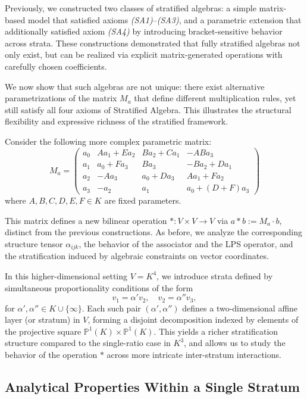 \documentclass[12pt]{article}
\theoremstyle{definition}
\theoremstyle{plain}
\theoremstyle{remark}
\begin{document}
Previously, we constructed two classes of stratified algebras: a simple matrix-based model that satisfied axioms \emph{(SA1)}–\emph{(SA3)}, and a parametric extension that additionally satisfied axiom \emph{(SA4)} by introducing bracket-sensitive behavior across strata. These constructions demonstrated that fully stratified algebras not only exist, but can be realized via explicit matrix-generated operations with carefully chosen coefficients.

We now show that such algebras are not unique: there exist alternative parametrizations of the matrix \( M_a \) that define different multiplication rules, yet still satisfy all four axioms of Stratified Algebra. This illustrates the structural flexibility and expressive richness of the stratified framework.

Consider the following more complex parametric matrix:
\[
M_a =
\begin{pmatrix}
a_0 & A a_1 + E a_2 & B a_2 + C a_1 & -A B a_3 \\
a_1 & a_0 + F a_3 & B a_3 & -B a_2 + D a_1 \\
a_2 & -A a_3 & a_0 + D a_3 & A a_1 + F a_2 \\
a_3 & -a_2 & a_1 & a_0 + (D + F) a_3
\end{pmatrix}
\]
where \( A, B, C, D, E, F \in K \) are fixed parameters.

This matrix defines a new bilinear operation \( * : V \times V \to V \) via \( a * b := M_a \cdot b \), distinct from the previous constructions. As before, we analyze the corresponding structure tensor \( \alpha_{ijk} \), the behavior of the associator and the LPS operator, and the stratification induced by algebraic constraints on vector coordinates.

In this higher-dimensional setting \( V = K^4 \), we introduce strata defined by simultaneous proportionality conditions of the form
\[
v_1 = \alpha' v_2, \quad v_2 = \alpha'' v_3,
\]
for \( \alpha', \alpha'' \in K \cup \{\infty\} \). Each such pair \( (\alpha', \alpha'') \) defines a two-dimensional affine layer (or stratum) in \( V \), forming a disjoint decomposition indexed by elements of the projective square \( \mathbb{P}^1(K) \times \mathbb{P}^1(K) \). This yields a richer stratification structure compared to the single-ratio case in \( K^3 \), and allows us to study the behavior of the operation \( * \) across more intricate inter-stratum interactions.

\subsection{Analytical Properties Within a Single Stratum}
\end{document}
